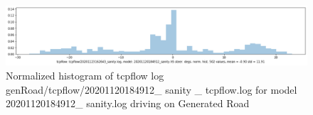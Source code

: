 \begin{figure}[ht]
 \centering 
 \includegraphics[width=\textwidth]{Figures/tcpflow_20201120184912_sanity_bins.png}
 \caption{Normalized histogram of tcpflow log genRoad/tcpflow/20201120184912\_ sanity \_ tcpflow.log for model 20201120184912\_ sanity.log driving on Generated Road}
 \label{fig:tcpflow_20201120184912_bins} 
\end{figure}



